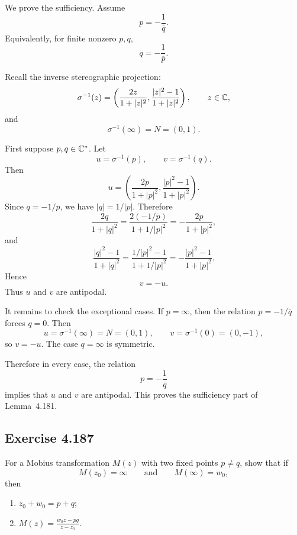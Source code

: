 \documentclass{article}
\begin{document}
\begin{solution}
  We prove the sufficiency. Assume
  \[
    p=-\frac1{\overline q}.
  \]
  Equivalently, for finite nonzero $p,q$,
  \[
    q=-\frac1{\overline p}.
  \]

  Recall the inverse stereographic projection:
  \[
    \sigma^{-1}(z)
    =
    \left(
      \frac{2z}{1+|z|^2},
      \frac{|z|^2-1}{1+|z|^2}
    \right),
    \qquad z\in\mathbb{C},
  \]
  and
  \[
    \sigma^{-1}(\infty)=N=(0,1).
  \]

  First suppose $p,q\in\mathbb{C}^\ast$. Let
  \[
    u=\sigma^{-1}(p),
    \qquad
    v=\sigma^{-1}(q).
  \]
  Then
  \[
    u=
    \left(
      \frac{2p}{1+|p|^2},
      \frac{|p|^2-1}{1+|p|^2}
    \right).
  \]
  Since $q=-1/\overline p$, we have $|q|=1/|p|$. Therefore
  \[
    \frac{2q}{1+|q|^2}
    =
    \frac{2(-1/\overline p)}{1+1/|p|^2}
    =
    -\frac{2p}{1+|p|^2},
  \]
  and
  \[
    \frac{|q|^2-1}{1+|q|^2}
    =
    \frac{1/|p|^2-1}{1+1/|p|^2}
    =
    -\frac{|p|^2-1}{1+|p|^2}.
  \]
  Hence
  \[
    v=-u.
  \]
  Thus $u$ and $v$ are antipodal.

  It remains to check the exceptional cases. If $p=\infty$, then the relation
  $p=-1/\overline q$ forces $q=0$. Then
  \[
    u=\sigma^{-1}(\infty)=N=(0,1),
    \qquad
    v=\sigma^{-1}(0)=(0,-1),
  \]
  so $v=-u$. The case $q=\infty$ is symmetric.

  Therefore in every case, the relation
  \[
    p=-\frac1{\overline q}
  \]
  implies that $u$ and $v$ are antipodal. This proves the sufficiency part of
  Lemma~4.181.
\end{solution}

\subsection{Exercise 4.187}
\label{sec:ca-ex-4-187}

For a Mobius transformation $M(z)$ with two fixed points $p\ne q$, show that
if
\[
  M(z_0)=\infty
  \qquad\text{and}\qquad
  M(\infty)=w_0,
\]
then

\begin{enumerate}
  \item[(a)] $z_0+w_0=p+q$;
  \item[(b)] $\displaystyle M(z)=\frac{w_0z-pq}{z-z_0}$.
\end{enumerate}
\end{document}
